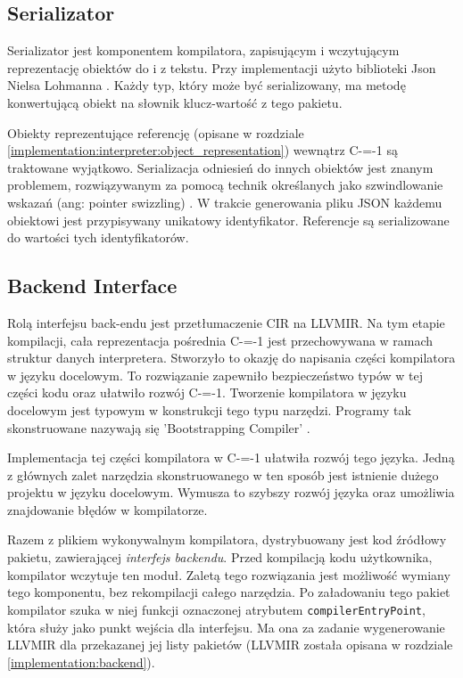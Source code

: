 \subsection{Serializator}
\label{serializer}

Serializator jest komponentem kompilatora, zapisującym i wczytującym reprezentację obiektów do i z tekstu.
Przy implementacji użyto biblioteki Json Nielsa Lohmanna \cite{lohmann}.
Każdy typ, który może być serializowany, ma metodę konwertującą obiekt na słownik klucz-wartość z tego pakietu.

Obiekty reprezentujące referencję (opisane w rozdziale \ref{implementation:interpreter:object_representation}) wewnątrz C-=-1 są traktowane wyjątkowo.
Serializacja odniesień do innych obiektów jest znanym problemem, rozwiązywanym za pomocą technik określanych jako szwindlowanie wskazań (ang: pointer swizzling) \cite{kemper1995swizzling}.
W trakcie generowania pliku JSON każdemu obiektowi jest przypisywany unikatowy identyfikator.
Referencje są serializowane do wartości tych identyfikatorów.

\subsection{Backend Interface}
\label{Backend_Interface}
Rolą interfejsu back-endu jest przetłumaczenie CIR na LLVMIR.
Na tym etapie kompilacji, cała reprezentacja pośrednia C-=-1 jest przechowywana w ramach struktur danych interpretera.
Stworzyło to okazję do napisania części kompilatora w języku docelowym.
To rozwiązanie zapewniło bezpieczeństwo typów w tej części kodu oraz ułatwiło rozwój C-=-1.
Tworzenie kompilatora w języku docelowym jest typowym w konstrukcji tego typu narzędzi.
Programy tak skonstruowane nazywają się 'Bootstrapping Compiler' \cite{puntambekar:compiler_design}. 

Implementacja tej części kompilatora w C-=-1 ułatwiła rozwój tego języka.
Jedną z głównych zalet narzędzia skonstruowanego w ten sposób jest istnienie dużego projektu w języku docelowym.
Wymusza to szybszy rozwój języka oraz umożliwia znajdowanie błędów w kompilatorze.

Razem z plikiem wykonywalnym kompilatora, dystrybuowany jest kod źródłowy pakietu, zawierającej \emph{interfejs backendu}. 
Przed kompilacją kodu użytkownika, kompilator wczytuje ten moduł.
Zaletą tego rozwiązania jest możliwość wymiany tego komponentu, bez rekompilacji całego narzędzia.
Po załadowaniu tego pakiet kompilator szuka w niej funkcji oznaczonej atrybutem \lstinline{compilerEntryPoint}, która służy jako punkt wejścia dla interfejsu. 
Ma ona za zadanie wygenerowanie LLVMIR dla przekazanej jej listy pakietów (LLVMIR została opisana w rozdziale \ref{implementation:backend}).

